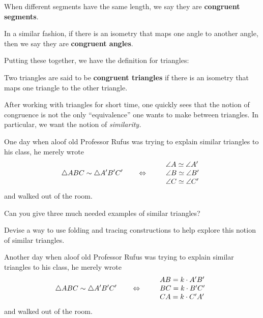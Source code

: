 \begin{dfn}
When different segments have the same length, we say they are
\textbf{congruent segments}. 
\end{dfn}

\begin{dfn}
In a similar fashion, if there is an isometry that maps one angle to another angle, then we say they are \textbf{congruent angles}.
\end{dfn}

Putting these together, we have the definition for triangles:

\begin{dfn} 
Two triangles are said to be \textbf{congruent triangles} if there is
an isometry that maps one triangle to the other triangle.
\end{dfn}


After working with triangles for short time, one quickly sees that the
notion of congruence is not the only ``equivalence'' one wants to
make between triangles. In particular, we want the notion of
\textit{similarity.} 

One day when aloof old Professor Rufus was trying to explain similar
triangles to his class, he merely wrote
\[
\triangle ABC \sim \triangle A'B'C' \qquad\Leftrightarrow \qquad\begin{array}{l}
\angle A \simeq \angle A'\\
\angle B \simeq \angle B' \\
\angle C \simeq \angle C'
\end{array}
\]
and walked out of the room.

\begin{ques} 
Can you give three much needed examples of similar triangles? 
\end{ques}
\QM

\begin{ques} 
Devise a way to use folding and tracing constructions to help explore this notion
of similar triangles.
\end{ques}
\QM

Another day when aloof old Professor Rufus was trying to explain
similar triangles to his class, he merely wrote
\[
\triangle ABC \sim \triangle A'B'C' \qquad\Leftrightarrow \qquad
\begin{array}{l}
AB = k\cdot A'B'\\
BC = k\cdot B'C' \\
CA = k\cdot C'A'
\end{array}
\]
and walked out of the room.

